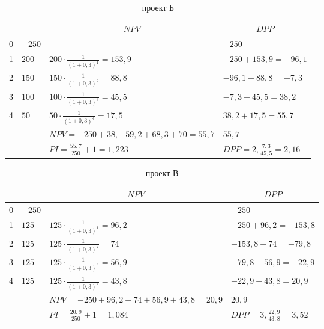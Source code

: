 \begin{table}[!h]
	\label{project_B}
	\caption{проект Б}
	\small
	\setlength{\extrarowheight}{1.2mm}
	\begin{tabularx}{\textwidth}{|K{1.12cm}|K{1.12cm}|p{8cm}|p{5cm}|}
		\hline
		& &                      &  \\  & $-250$&                                                                   &  $    -250   $                 \\  & $200$&$200 \cdot \frac{1}{(1+0,3)^1} = 153,9$  &$ -250 +153,9   = -96,1     $            \\  & $150$&$150 \cdot \frac{1}{(1+0,3)^2} = 88,8$ & $-96,1  +88,8=-7,3      $           \\  &$100$& $100 \cdot \frac{1}{(1+0,3)^3} = 45,5$ &$-7,3  +45,5=38,2    $             \\  &$50$&$50 \cdot \frac{1}{(1+0,3)^4} =17,5$  & $38,2 +17,5= 55,7     $                \\ \hline
		&&$NPV = -250+38,+59,2+68,3+70=55,7$     & $55,7 $                     \\ \hline
		&&$PI = \frac{55,7}{250}+1=1,223$                                        & $DPP = 2,\frac{7,3}{45,5}=2,16$                 \\ \hline
	\end{tabularx}
\end{table}

\begin{table}[!h]
	\caption{проект В}
	\label{project_C}
	\small
	\setlength{\extrarowheight}{1.2mm}
	\begin{tabularx}{\textwidth}{|K{1.12cm}|K{1.12cm}|p{8cm}|p{5cm}|}
		\hline
		& &                    &  \\  &$-250$&                                                                     &  $    -250   $                 \\  & $125$&$125 \cdot \frac{1}{(1+0,3)^1} = 96,2$ &$ -250 +96,2   =-153,8     $            \\  & $125$&$125 \cdot \frac{1}{(1+0,3)^2} = 74$    & $-153,8  +74=-79,8      $           \\  &$125$& $125 \cdot \frac{1}{(1+0,3)^3} = 56,9$ &$-79,8  +56,9=-22,9    $             \\  & $125$&$125 \cdot \frac{1}{(1+0,3)^4} =43,8$  & $-22,9 +43,8= 20,9     $                \\ \hline
		&&$NPV = -250+96,2+74+56,9+43,8=20,9$     & $20,9 $                     \\ \hline
		&&$PI = \frac{20,9}{250}+1=1,084$               & $DPP = 3,\frac{22,9}{43,8}=3,52$                 \\ \hline
	\end{tabularx}
\end{table}

